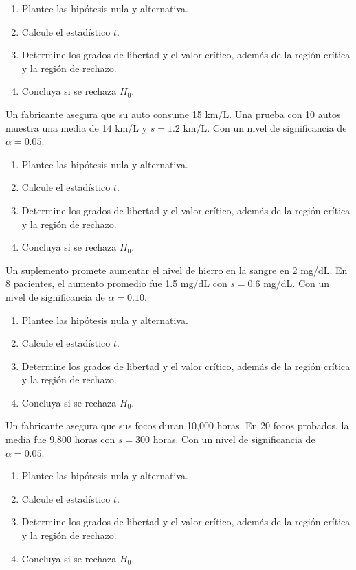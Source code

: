 \documentclass[addpoints,12pt]{exam}
\theoremstyle{plain}
\theoremstyle{remark}
\theoremstyle{definition}
\begin{document}
\begin{questions}
\begin{enumerate}[$1.$]
\item Plantee las hipótesis nula y alternativa.  
\item Calcule el estadístico \( t \).  
\item Determine los grados de libertad y el valor crítico, además de la región crítica y la región de rechazo.  
\item Concluya si se rechaza \( H_0 \).  
\end{enumerate}

 \question Un fabricante asegura que su auto consume 15 km/L. Una prueba con 10 autos muestra una media de 14 km/L y \( s = 1.2 \) km/L.  Con un nivel de significancia de \( \alpha = 0.05 \).  

\begin{enumerate}[$1.$]
\item Plantee las hipótesis nula y alternativa.  
\item Calcule el estadístico \( t \).  
\item Determine los grados de libertad y el valor crítico, además de la región crítica y la región de rechazo.  
\item Concluya si se rechaza \( H_0 \).  
\end{enumerate}

 \question Un suplemento promete aumentar el nivel de hierro en la sangre en 2 mg/dL. En 8 pacientes, el aumento promedio fue 1.5 mg/dL con \( s = 0.6 \) mg/dL. Con un nivel de significancia de \( \alpha = 0.10 \).  

\begin{enumerate}[$1.$]
\item Plantee las hipótesis nula y alternativa.  
\item Calcule el estadístico \( t \).  
\item Determine los grados de libertad y el valor crítico, además de la región crítica y la región de rechazo.  
\item Concluya si se rechaza \( H_0 \).  
\end{enumerate}

 \question Un fabricante asegura que sus focos duran 10,000 horas. En 20 focos probados, la media fue 9,800 horas con \( s = 300 \) horas.  Con un nivel de significancia de \( \alpha = 0.05 \).  

\begin{enumerate}[$1.$]
\item Plantee las hipótesis nula y alternativa.  
\item Calcule el estadístico \( t \).  
\item Determine los grados de libertad y el valor crítico, además de la región crítica y la región de rechazo.  
\item Concluya si se rechaza \( H_0 \).  
\end{enumerate}



\end{questions}
\end{document}
